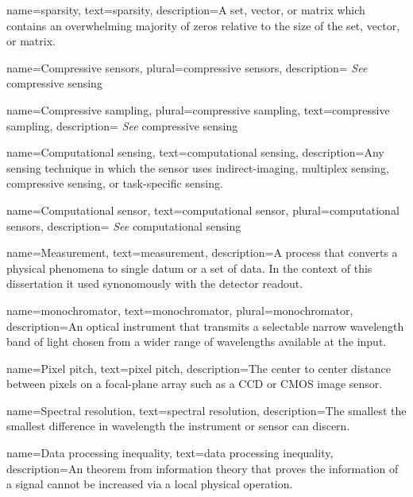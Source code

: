 {
name={sparsity},
text={sparsity},
description={A set, vector, or matrix which contains an overwhelming majority of zeros relative to the size of the set, vector, or matrix. }
}



{
name={Compressive sensors},
plural={compressive sensors},
description={ \emph{See} \gls{compressive sensing}}
}

{
name={Compressive sampling},
plural={compressive sampling},
text={compressive sampling},
description={ \emph{See} \gls{compressive sensing}}
}

{
name={Computational sensing},
text={computational sensing},
description={Any sensing technique in which the sensor uses \gls{indirect-imaging}, \gls{multiplex sensing}, \gls{compressive sensing}, or \gls{task-specific sensing}.}
}

{
name={Computational sensor},
text={computational sensor},
plural={computational sensors},
description={ \emph{See} \gls{computational sensing}}
}


{
name={Measurement},
text={measurement},
description={A process that converts a physical phenomena to single datum or a set of data. In the context of this dissertation it used synonomously with the detector readout.}
}

{
name={monochromator},
text={monochromator},
plural={monochromator},
description={An optical instrument that transmits a selectable narrow wavelength band of light chosen from a wider range of wavelengths available at the input.}
}

{
name={Pixel pitch},
text={pixel pitch},
description={The center to center distance between pixels on a focal-plane array such as a CCD or CMOS image sensor.}
}

{
name={Spectral resolution},
text={spectral resolution},
description={The smallest the smallest difference in wavelength the instrument or sensor can discern.}
}

{
name={Data processing inequality},
text={data processing inequality},
description={An theorem from information theory that proves the information of a signal cannot be increased via a local physical operation.}
}


